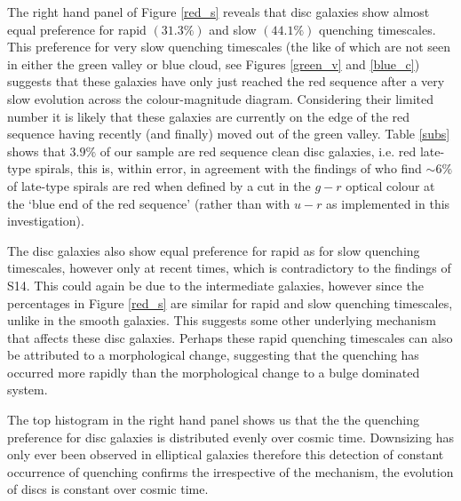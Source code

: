 \documentclass[useAMS,usenatbib]{mn2e}
\def\changed    {\color{titlecol} }
\begin{document}

{\changed The right hand panel of Figure \ref{red_s} reveals that disc galaxies show almost equal preference for rapid $(31.3\%)$ and slow $(44.1\%)$ quenching timescales. This preference for very slow quenching timescales (the like of which are not seen in either the green valley or blue cloud, see Figures \ref{green_v} and \ref{blue_c})} suggests that these  galaxies have only just reached the red sequence after a very slow evolution across the colour-magnitude diagram. Considering their limited number it is likely that these galaxies are currently on the edge of the red sequence having recently (and finally) moved out of the green valley. Table \ref{subs} shows that $3.9\%$ of our sample are red sequence clean disc galaxies, i.e. red late-type spirals, this is, within error, in agreement with the findings of \citet{Masters10} who find $\sim6\%$ of late-type spirals are red when defined by a cut in the $g-r$ optical colour at the `blue end of the red sequence' (rather than with $u-r$ as implemented in this investigation).

{\changed The disc galaxies also show equal preference for rapid as for slow quenching timescales, however only at recent times, which is contradictory to the findings of S14. This could again be due to the intermediate galaxies, however since the percentages in Figure \ref{red_s} are similar for rapid and slow quenching timescales, unlike in the smooth galaxies. This suggests some other underlying mechanism that affects these disc galaxies. Perhaps these rapid quenching timescales can also be attributed to a morphological change, suggesting that the quenching has occurred more rapidly than the morphological change to a bulge dominated system.

The top histogram in the right hand panel shows us that the the quenching preference for disc galaxies is distributed evenly over cosmic time. Downsizing has only ever been observed in elliptical galaxies \citep{Thomas10} therefore this detection of constant occurrence of quenching confirms the irrespective of the mechanism, the evolution of discs is constant over cosmic time.  }
\end{document}
